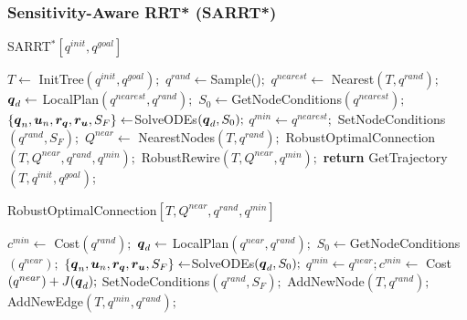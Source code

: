 \subsubsection{Sensitivity-Aware RRT* (SARRT*)}

\begin{algorithm}[t]
    \caption{SARRT$^* [q^{init}, q^{goal}]$}\label{alg:SARRT*}
    \begin{algorithmic}[1]
        \State $T \gets$ InitTree$({q^{init}, q^{goal}});$
            \State $q^{rand} \gets $Sample()$;$
            \State $q^{nearest} \gets$ Nearest$(T,{q^{rand}});$
            \State $\boldsymbol{q}_d \gets$ LocalPlan$({q^{nearest}},{q^{rand}});$
            \State $S_0 \gets $GetNodeConditions$({q^{nearest}});$
            \State $\left \{\boldsymbol{q}_n, \boldsymbol{u}_n, \boldsymbol{r_q}, \boldsymbol{r_u}, S_F \right \}  \gets $SolveODEs$(\boldsymbol{q}_d, S_0);$
                \State $q^{min} \gets q^{nearest};$
                \State SetNodeConditions$({q^{rand}}, S_{F});$
                \State $Q^{near} \gets$ NearestNodes$(T,{q^{rand}});$
                \State RobustOptimalConnection$(T, Q^{near}, q^{rand}, q^{min});$
                \State RobustRewire$(T, Q^{near}, q^{min});$
            \EndIf
        \EndWhile
        \State \textbf{return} GetTrajectory$(T, q^{init}, q^{goal})$;
    \end{algorithmic}
\end{algorithm}

\begin{algorithm}[t]
    \caption{RobustOptimalConnection$[T, Q^{near}, q^{rand}, q^{min}]$}\label{alg:RobustOptimalConnect}
    \begin{algorithmic}[1]
        \State $c^{min} \gets$ Cost$(q^{rand});$
            \State $\boldsymbol{q}_d \gets$ LocalPlan$(q^{near},q^{rand});$
            \State $S_0 \gets $GetNodeConditions$({q^{near}});$
            \State $\left \{\boldsymbol{q}_n, \boldsymbol{u}_n, \boldsymbol{r_q}, \boldsymbol{r_u}, S_F \right \}  \gets $SolveODEs$(\boldsymbol{q}_d, S_0);$
                    \State $q^{min} \gets q^{near}; c^{min} \gets$ Cost$(q^{near}) + J(\boldsymbol{q}_d);$
                    \State SetNodeConditions$({q^{rand}}, S_{F});$
                \EndIf
            \EndIf
        \EndFor
        \State AddNewNode$(T, {q^{rand}});$
        \State AddNewEdge$(T, {q^{min}}, {q^{rand}});$
    \end{algorithmic}
\end{algorithm}

